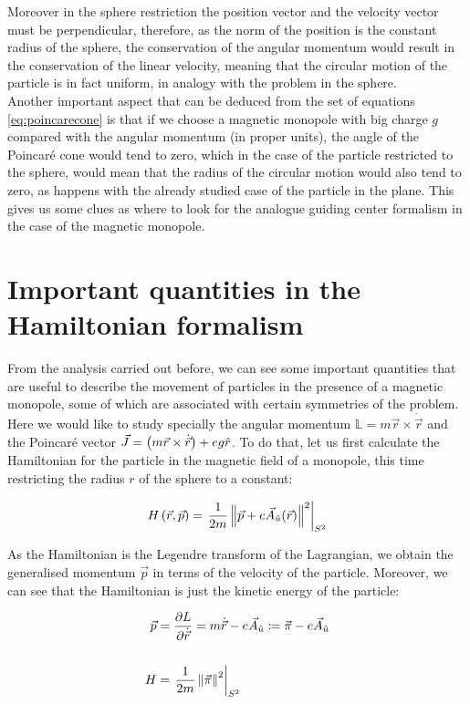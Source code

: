 Moreover in the sphere restriction the position vector and the velocity vector must be perpendicular, therefore, as the norm of the position is the constant radius of the sphere, the conservation of the angular momentum would result in the conservation of the linear velocity, meaning that the circular motion of the particle is in fact uniform, in analogy with the problem in the sphere.\\

Another important aspect that can be deduced from the set of equations \eqref{eq:poincarecone} is that if we choose a magnetic monopole with big charge $g$ compared with the angular momentum (in proper units), the angle of the Poincar\'e cone would tend to zero, which in the case of the particle restricted to the sphere, would mean that the radius of the circular motion would also tend to zero, as happens with the already studied case of the particle in the plane. This gives us some clues as where to look for the analogue guiding center formalism in the case of the magnetic monopole.\\

\section{Important quantities in the Hamiltonian formalism}
From the analysis carried out before, we can see some important quantities that are useful to describe the movement of particles in the presence of a magnetic monopole, some of which are associated with certain symmetries of the problem. Here we would like to study specially the angular momentum $\mathbb{L}= m\vec{r}\times\dot{\vec{r}}$ and the Poincar\'e vector $\vec{J} = \left( m\vec{r}\times\dot{\vec{r}} \right)+ eg\hat{r}$. To do that, let us first calculate the Hamiltonian for the particle in the magnetic field of a monopole, this time restricting the radius $r$ of the sphere to a constant:

\begin{equation}
H\left( \vec{r},\vec{p} \right) = \left.\frac{1}{2m}\left\lVert \vec{p}+e\vec{A}_{\hat{u}}(\vec{r}) \right\rVert^2\right|_{S^2}
\label{eq:hamiltonian}
\end{equation}

As the Hamiltonian is the Legendre transform of the Lagrangian, we obtain the generalised momentum $\vec{p}$  in terms of the velocity of the particle. Moreover, we can see that the Hamiltonian is just the kinetic energy of the particle:

\begin{equation*}
\begin{aligned}
\vec{p} &= \frac{\partial L}{\partial \dot{\vec{r}}} = m\dot{\vec{r}}-e\vec{A}_{\hat{u}} \coloneqq \vec{\pi}-e\vec{A}_{\hat{u}} \\
\\
H &= \left.\frac{1}{2m}\left\lVert \vec{\pi} \right\rVert^2\right|_{S^2}
\end{aligned}
\end{equation*}

